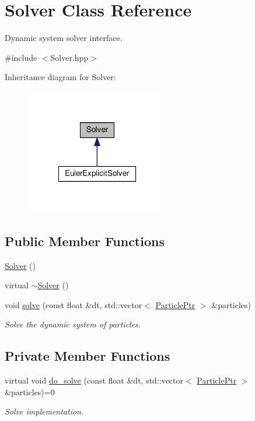 \hypertarget{classSolver}{\section{Solver Class Reference}
\label{classSolver}
}


Dynamic system solver interface.  




{\ttfamily \#include $<$Solver.\+hpp$>$}



Inheritance diagram for Solver\+:\nopagebreak
\begin{figure}[H]
\begin{center}
\leavevmode
\includegraphics[width=178pt]{classSolver__inherit__graph}
\end{center}
\end{figure}
\subsection*{Public Member Functions}
\begin{DoxyCompactItemize}
\item 
\hyperlink{classSolver_a9dfe7ae9ce617e8a6398be34284c907a}{Solver} ()
\item 
virtual \hyperlink{classSolver_a14f7014dd6e46e3990dea30b5ad3c087}{$\sim$\+Solver} ()
\item 
void \hyperlink{classSolver_a61a7ee82c1f64bec35c76d1efd3b26f6}{solve} (const float \&dt, std\+::vector$<$ \hyperlink{Particle_8hpp_a9a7abc8635002993537b61ef2c857fdd}{Particle\+Ptr} $>$ \&particles)
\begin{DoxyCompactList}\small\item\em Solve the dynamic system of particles. \end{DoxyCompactList}\end{DoxyCompactItemize}
\subsection*{Private Member Functions}
\begin{DoxyCompactItemize}
\item 
virtual void \hyperlink{classSolver_a4559f655c64c879fffd49557de27ab7d}{do\+\_\+solve} (const float \&dt, std\+::vector$<$ \hyperlink{Particle_8hpp_a9a7abc8635002993537b61ef2c857fdd}{Particle\+Ptr} $>$ \&particles)=0
\begin{DoxyCompactList}\small\item\em Solve implementation. \end{DoxyCompactList}\end{DoxyCompactItemize}


